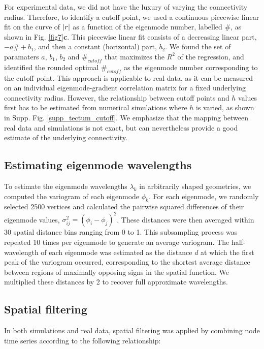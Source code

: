 \documentclass{article}
\begin{document}
For experimental data, we did not have the luxury of varying the connectivity radius. Therefore, to identify a cutoff point, we used a continuous piecewise linear fit on the curve of $\abs{r}$ as a function of the eigenmode number, labelled \#, as shown in Fig. \ref{fig7}\textbf{c}. This piecewise linear fit consists of a decreasing linear part, $-a\#+b_1$, and then a constant (horizontal) part, $b_2$. We found the set of paramaters $a$, $b_1$, $b_2$ and $\#_{cutoff}$ that maximizes the $R^2$ of the regression, and identified the rounded optimal $\#_{cutoff}$ as the eigenmode number corresponding to the cutoff point. This approach is applicable to real data, as it can be measured on an individual eigenmode-gradient correlation matrix for a fixed underlying connectivity radius. However, the relationship between cutoff points and $h$ values first has to be estimated from numerical simulations where $h$ is varied, as shown in Supp. Fig. \ref{supp_tectum_cutoff}. We emphasize that the mapping between real data and simulations is not exact, but can nevertheless provide a good estimate of the underlying connectivity.

\subsection*{Estimating eigenmode wavelengths}

To estimate the eigenmode wavelengths $\lambda_k$ in arbitrarily shaped geometries, we computed the variogram of each eigenmode $\phi_k$. For each eigenmode, we randomly selected 2500 vertices and calculated the pairwise squared differences of their eigenmode values, $\sigma^2_{ij}=(\phi_i - \phi_j)^2$. These distances were then averaged within 30 spatial distance bins ranging from 0 to 1. This subsampling process was repeated 10 times per eigenmode to generate an average variogram. The half-wavelength of each eigenmode was estimated as the distance $d$ at which the first peak of the variogram occurred, corresponding to the shortest average distance between regions of maximally opposing signs in the spatial function. We multiplied these distances by 2 to recover full approximate wavelengths.

\subsection*{Spatial filtering}

In both simulations and real data, spatial filtering was applied by combining node time series according to the following relationship:
\end{document}
